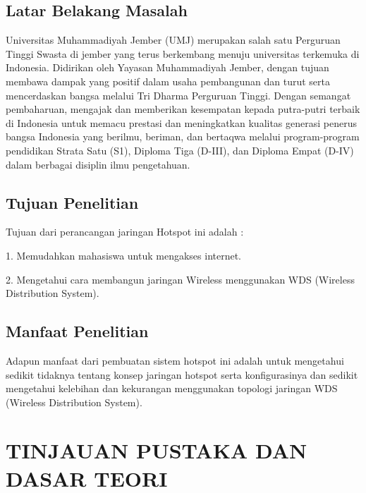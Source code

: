 \documentclass{jtetiproposalskripsi}
\begin{document}
\section{Latar Belakang Masalah}
Universitas  Muhammadiyah Jember  (UMJ)  merupakan  salah  satu  Perguruan Tinggi Swasta di jember yang terus berkembang menuju universitas terkemuka di Indonesia. Didirikan oleh Yayasan Muhammadiyah Jember, dengan tujuan membawa dampak yang positif dalam usaha pembangunan dan turut serta mencerdaskan bangsa melalui Tri Dharma Perguruan Tinggi. Dengan semangat pembaharuan, mengajak dan memberikan kesempatan kepada putra-putri terbaik di Indonesia untuk memacu prestasi dan meningkatkan kualitas generasi penerus bangsa Indonesia yang berilmu, beriman, dan bertaqwa melalui program-program pendidikan Strata Satu (S1), Diploma Tiga (D-III), dan Diploma Empat (D-IV) dalam berbagai disiplin ilmu pengetahuan. 



\section{Tujuan Penelitian}
Tujuan dari perancangan jaringan Hotspot ini adalah :

1.  Memudahkan mahasiswa untuk mengakses internet.

2. Mengetahui cara membangun jaringan Wireless menggunakan WDS (Wireless Distribution System).



\section{Manfaat Penelitian}
Adapun manfaat dari pembuatan sistem hotspot ini adalah untuk mengetahui sedikit tidaknya tentang konsep jaringan hotspot serta konfigurasinya dan sedikit mengetahui  kelebihan  dan  kekurangan  menggunakan  topologi  jaringan  WDS
(Wireless Distribution System).
 

\chapter{TINJAUAN PUSTAKA DAN DASAR TEORI}                
\end{document}

